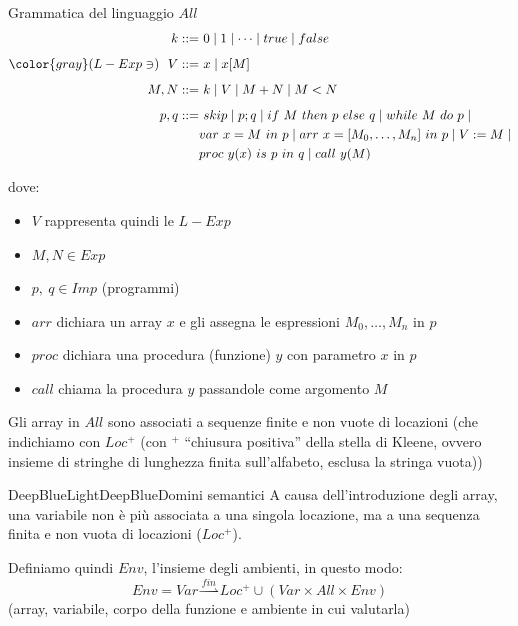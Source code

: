 \documentclass[a4paper,11pt]{report}
\newcommand{\farrow}{\overset{fin}{\rightharpoonup}}
\begin{document}
\begin{defframe}{Grammatica del linguaggio \( All \)}{}
    \vspace{-2em}
\begin{align*}
    k ::=& \ 0 \mid 1 \mid \dots \mid true \mid false\\[0.5em]
  {\color{gray}(L-Exp \ni)}\ \ V  ::=& \ x \mid x[M]  \\[0.5em]
  M, N ::=& \ k \mid V \mid M + N \mid M < N \\[0.5em]
    p, q ::=& \ skip \mid p;q \mid if \ M \ then \ p \ else \ q \mid while \ M \ do \ p \mid \\
                   &var \ x = M \ in \ p \mid arr \ x = [M_0, \dots, M_n] \  in \ p \mid V:= M \mid \\
                   &proc \ y(x) \ is \ p \ in \ q \mid call \ y(M)
\end{align*}

    dove:
    \begin{itemize}
        \item \( V\) rappresenta quindi le \( L-Exp \)
        \item \( M, N \in Exp \)
        \item \( p, \ q \in Imp\) (programmi)
        \item \( arr \) dichiara un array \( x \) e gli assegna le espressioni \( M_0, \dots, M_n \) in \( p \)
        \item \( proc \) dichiara una procedura (funzione) \( y \) con parametro \( x \) in \( p \)
        \item \( call \) chiama la procedura \( y \) passandole come argomento \( M \)
    \end{itemize}
\end{defframe}

Gli array in \( All \) sono associati a sequenze finite e non vuote di locazioni (che indichiamo con \( Loc^+ \) {\small \color{gray}(con $^+$ ``chiusura positiva'' della stella di Kleene, ovvero insieme di stringhe di lunghezza finita sull'alfabeto, esclusa la stringa vuota)})

\begin{cframe}{DeepBlueLight}{DeepBlue}{Domini semantici}
        A causa dell'introduzione degli array, una variabile non è più associata a una singola locazione, ma a una sequenza finita e non vuota di locazioni ($Loc^+$).
    
        Definiamo quindi \( Env \), l'insieme degli ambienti, in questo modo:
    \[ Env = Var \farrow Loc^+ \cup (Var \times All \times Env) \]
    {\small \color{gray}(array, variabile, corpo della funzione e ambiente in cui valutarla)}
\end{cframe}
\end{document}
